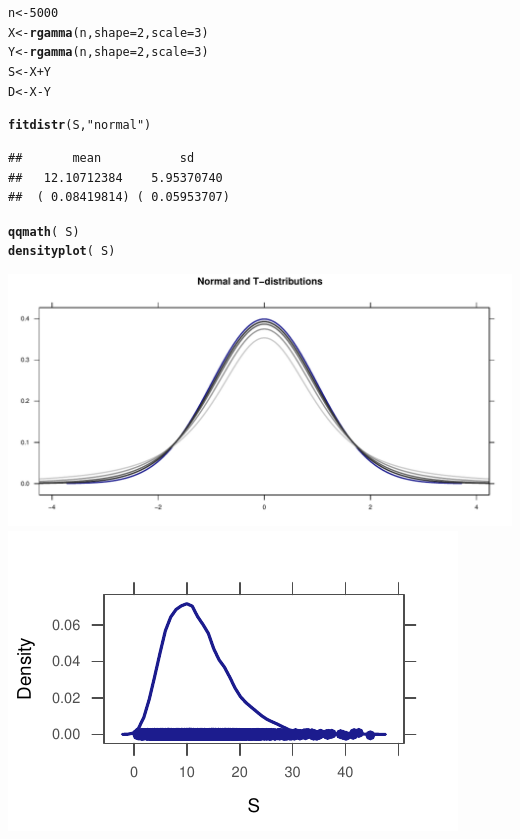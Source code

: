 \documentclass[twoside]{book}\usepackage[]{graphicx}\usepackage[]{xcolor}
\makeatletter
\def\maxwidth{ %
  \ifdim\Gin@nat@width>\linewidth
    \linewidth
  \else
    \Gin@nat@width
  \fi
}
\newcommand{\hlnum}[1]{\textcolor[rgb]{0.686,0.059,0.569}{#1}}%
\newcommand{\hlstr}[1]{\textcolor[rgb]{0.192,0.494,0.8}{#1}}%
\newcommand{\hlopt}[1]{\textcolor[rgb]{0,0,0}{#1}}%
\newcommand{\hlstd}[1]{\textcolor[rgb]{0.345,0.345,0.345}{#1}}%
\newcommand{\hlkwb}[1]{\textcolor[rgb]{0.69,0.353,0.396}{#1}}%
\newcommand{\hlkwc}[1]{\textcolor[rgb]{0.333,0.667,0.333}{#1}}%
\newcommand{\hlkwd}[1]{\textcolor[rgb]{0.737,0.353,0.396}{\textbf{#1}}}%
\newenvironment{kframe}{%
 \def\at@end@of@kframe{}%
 \ifinner\ifhmode%
  \def\at@end@of@kframe{\end{minipage}}%
  \begin{minipage}{\columnwidth}%
 \fi\fi%
 \def\FrameCommand##1{\hskip\@totalleftmargin \hskip-\fboxsep
 \colorbox{shadecolor}{##1}\hskip-\fboxsep
     \hskip-\linewidth \hskip-\@totalleftmargin \hskip\columnwidth}%
 \MakeFramed {\advance\hsize-\width
   \@totalleftmargin\z@ \linewidth\hsize
   \@setminipage}}%
 {\par\unskip\endMakeFramed%
 \at@end@of@kframe}
\newenvironment{knitrout}{}{} %
\makeatother
\begin{document}
\begin{solution}
\begin{knitrout}
\color{fgcolor}\begin{kframe}
\begin{alltt}
\hlstd{n} \hlkwb{<-} \hlnum{5000}
\hlstd{X} \hlkwb{<-} \hlkwd{rgamma}\hlstd{(n,} \hlkwc{shape} \hlstd{=} \hlnum{2}\hlstd{,} \hlkwc{scale} \hlstd{=} \hlnum{3}\hlstd{)}
\hlstd{Y} \hlkwb{<-} \hlkwd{rgamma}\hlstd{(n,} \hlkwc{shape} \hlstd{=} \hlnum{2}\hlstd{,} \hlkwc{scale} \hlstd{=} \hlnum{3}\hlstd{)}
\hlstd{S} \hlkwb{<-} \hlstd{X} \hlopt{+} \hlstd{Y}
\hlstd{D} \hlkwb{<-} \hlstd{X} \hlopt{-} \hlstd{Y}
\end{alltt}
\end{kframe}
\end{knitrout}
\begin{knitrout}
\color{fgcolor}\begin{kframe}
\begin{alltt}
\hlkwd{fitdistr}\hlstd{(S,} \hlstr{"normal"}\hlstd{)}
\end{alltt}
\begin{verbatim}
##       mean           sd     
##   12.10712384    5.95370740 
##  ( 0.08419814) ( 0.05953707)
\end{verbatim}
\begin{alltt}
\hlkwd{qqmath}\hlstd{(}\hlopt{~}\hlstd{S)}
\hlkwd{densityplot}\hlstd{(}\hlopt{~}\hlstd{S)}
\end{alltt}
\end{kframe}

{\centering \includegraphics[width=\maxwidth]{figures/fig-unnamed-chunk-128-1} 
\includegraphics[width=\maxwidth]{figures/fig-unnamed-chunk-128-2} 

}
\end{knitrout}
\end{solution}
\end{document}
